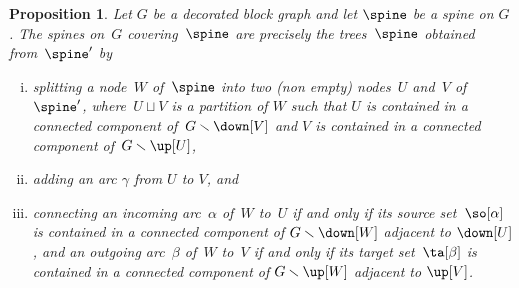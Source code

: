 \documentclass{amsart}
\newtheorem{proposition}[theorem]{Proposition}
\theoremstyle{definition}
\newtheorem{remark}[theorem]{Remark}
\newcommand{\ssm}{\smallsetminus} %
\begin{document}
\begin{proposition}
  \label{prop:vertexsplitting} 
  Let $G$ be a decorated block graph and let $\spine$ be a spine on $G$.
  The spines on~$G$ covering~$\spine$ are precisely the trees~$\spine$ obtained from~$\spine'$ by
  \begin{enumerate}[(i)]
    \item splitting a node~$W$ of~$\spine$ into two (non empty) nodes~$U$ and~$V$ of~$\spine'$, where~$U \sqcup V$ is a partition of $W$ such that $U$ is contained in a connected component of~$G \ssm \down[V]$ and $V$ is contained in a connected component of~$G \ssm \up[U]$,
    \item adding an arc $\gamma$ from $U$ to $V$, and 
    \item connecting an incoming arc~$\alpha$ of~$W$ to~$U$ if and only if its source set~$\so[\alpha]$ is contained in a connected component of $G \ssm \down[W]$ adjacent to $\down[U]$, and an outgoing arc~$\beta$ of~$W$ to~$V$ if and only if its target set~$\ta[\beta]$ is contained in a connected component of $G \ssm \up[W]$ adjacent to $\up[V]$.
  \end{enumerate}
\end{proposition}

\end{document}

